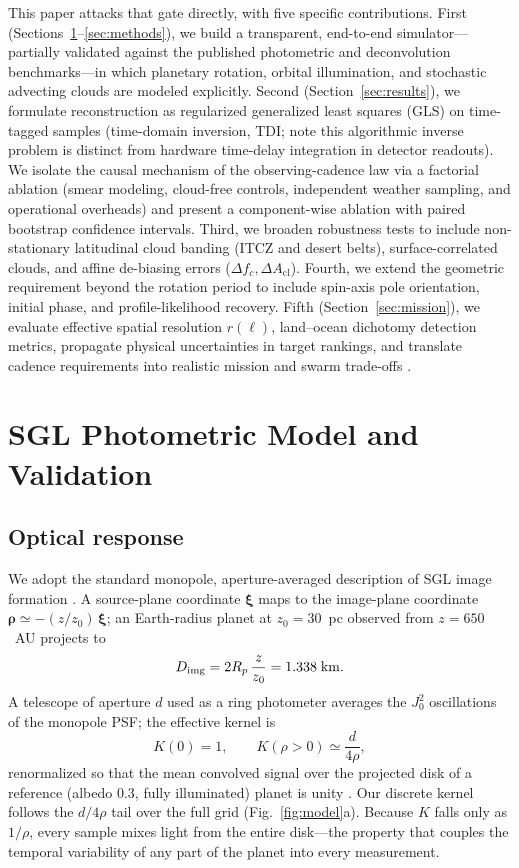 \documentclass[twocolumn]{emulateapj}
\begin{document}
This paper attacks that gate directly, with five specific contributions.
First (Sections~\ref{sec:model}--\ref{sec:methods}), we build a transparent,
end-to-end simulator---partially validated against the published photometric
and deconvolution benchmarks---in which planetary rotation, orbital
illumination, and stochastic advecting clouds are modeled explicitly.
Second (Section~\ref{sec:results}), we formulate reconstruction as regularized
generalized least squares (GLS) on time-tagged samples (time-domain inversion,
TDI; note this algorithmic inverse problem is distinct from hardware
time-delay integration in detector readouts). We isolate the causal mechanism
of the observing-cadence law via a factorial ablation (smear modeling,
cloud-free controls, independent weather sampling, and operational overheads)
and present a component-wise ablation with paired bootstrap confidence intervals.
Third, we broaden robustness tests to include non-stationary latitudinal cloud
banding (ITCZ and desert belts), surface-correlated clouds, and affine
de-biasing errors ($\Delta f_c, \Delta A_{\text{cl}}$). Fourth, we extend the
geometric requirement beyond the rotation period to include spin-axis pole
orientation, initial phase, and profile-likelihood recovery. Fifth
(Section~\ref{sec:mission}), we evaluate effective spatial resolution $r(\ell)$,
land--ocean dichotomy detection metrics, propagate physical uncertainties in
target rankings, and translate cadence requirements into realistic mission and
swarm trade-offs \citep{niac20,helvajian23,friedman24,tur26prop}.

\section{SGL Photometric Model and Validation}
\label{sec:model}

\subsection{Optical response}
We adopt the standard monopole, aperture-averaged description of SGL
image formation \citep{tt20psf,toth21,tur26bench}. A source-plane
coordinate $\boldsymbol{\xi}$ maps to the image-plane coordinate
$\boldsymbol{\rho}\simeq-(z/z_0)\,\boldsymbol{\xi}$; an Earth-radius
planet at $z_0=30$~pc observed from $z=650$~AU projects to
\begin{equation}
D_{\rm img}=2R_p\,\frac{z}{z_0}=1.338\;{\rm km}.
\end{equation}
A telescope of aperture $d$ used as a ring photometer averages the
$J_0^2$ oscillations of the monopole PSF; the effective kernel is
\begin{equation}
K(0)=1,\qquad K(\rho>0)\simeq\frac{d}{4\rho},
\label{eq:kernel}
\end{equation}
renormalized so that the mean convolved signal over the projected disk
of a reference (albedo 0.3, fully illuminated) planet is unity
\citep{tur26bench}. Our discrete kernel follows the $d/4\rho$ tail over
the full grid (Fig.~\ref{fig:model}a). Because $K$ falls only as
$1/\rho$, every sample mixes light from the entire disk---the property
that couples the temporal variability of any part of the planet into
every measurement.
\end{document}
